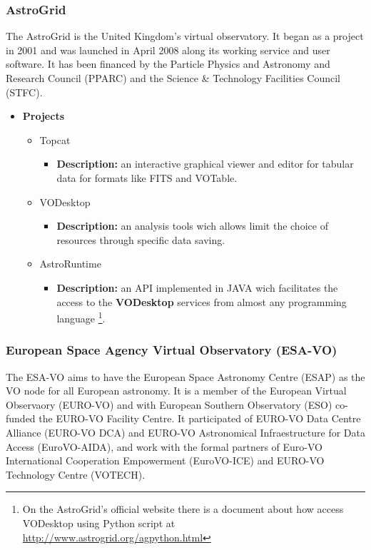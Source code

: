 \subsubsection{AstroGrid}
The AstroGrid is the United Kingdom's virtual observatory. It began as a project
in 2001 and was launched in April 2008 along its working service and user
software. It has been financed by the Particle Physics and Astronomy and
Research Council (PPARC) and the Science \& Technology Facilities Council
(STFC).

\begin{itemize}
\item \textbf{Projects}
\begin{itemize}
\item Topcat
\begin{itemize}
\item \textbf{Description:} an interactive graphical viewer and editor for
tabular data for formats like FITS and VOTable.
\end{itemize}
\item VODesktop
\begin{itemize}
\item \textbf{Description:} an analysis tools wich allows limit the choice of
resources through specific data saving.
\end{itemize}
\item AstroRuntime
\begin{itemize}
\item \textbf{Description:} an API implemented in JAVA wich facilitates the
access to the \textbf{VODesktop} services from almost any programming language
\footnote{On the AstroGrid's official website there is a document about how
access VODesktop using Python script at
\url{http://www.astrogrid.org/agpython.html}}.
\end{itemize}
\end{itemize}
\end{itemize}

\subsubsection{European Space Agency Virtual Observatory (ESA-VO)}
The ESA-VO aims to have the European Space Astronomy Centre (ESAP) as the VO
node for all European astronomy. It is a member of the European Virtual
Observaory (EURO-VO) and with European Southern Observatory (ESO) co-funded the
EURO-VO Facility Centre. It participated of EURO-VO Data Centre Alliance
(EURO-VO DCA) and EURO-VO Astronomical Infraestructure for Data Access
(EuroVO-AIDA), and work with the formal partners of Euro-VO International
Cooperation Empowerment (EuroVO-ICE) and EURO-VO Technology Centre (VOTECH).


